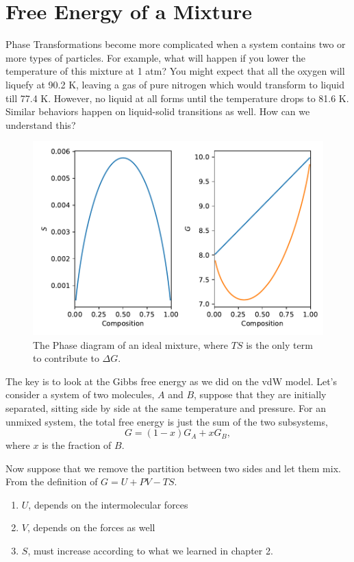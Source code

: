 

\section{Free Energy of a Mixture}
Phase Transformations become more complicated when a system contains two or more types of particles. For example, what will happen if you lower the temperature of this mixture at 1 atm? You might expect that all the oxygen will liquefy at 90.2 K, leaving a gas of pure nitrogen which would transform to liquid till 77.4 K. However, no liquid at all forms until the temperature drops to 81.6 K. Similar behaviors happen on liquid-solid transitions as well. How can we understand this?

\begin{figure}[h]
\centering
\label{ideal-mix}
\includegraphics[width=12cm]{imgs/Ideal-Mixture.pdf}
\caption{The Phase diagram of an ideal mixture, where $TS$ is the only term to contribute to $\Delta{G}$. }
\end{figure}


The key is to look at the Gibbs free energy as we did on the vdW model. Let's consider a system of two molecules, $A$
and $B$, suppose that they are initially separated, sitting side by side at the same temperature and pressure. For
an unmixed system, the total free energy is just the sum of the two subsystems,
\begin{equation}
G = (1-x)G_A + xG_B,
\end{equation}
where $x$ is the fraction of $B$. 

Now suppose that we remove the partition between two sides and let them mix. From the definition of $G=U+PV-TS$.
\begin{enumerate}
\item $U$, depends on the intermolecular forces
\item $V$, depends on the forces as well
\item $S$, must increase according to what we learned in chapter 2.
\end{enumerate}

